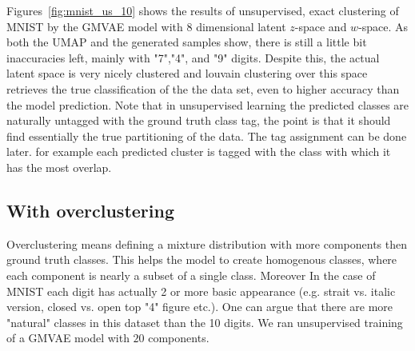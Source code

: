 \documentclass[11pt, a4paper]{report}
\theoremstyle{plain}
\theoremstyle{definition}
\theoremstyle{remark}
\begin{document}
Figures~\ref{fig:mnist_us_10} shows the results of unsupervised, exact clustering
of MNIST by the GMVAE model with 8 dimensional latent $z$-space and
$w$-space.
As both the UMAP and the generated samples show, there is still a little bit
inaccuracies left, mainly with "7","4", and "9" digits.
Despite this, the actual latent space is very nicely clustered and louvain
clustering over this space retrieves the true classification of the the data
set, even to higher accuracy than the model prediction.
Note that in unsupervised learning the predicted classes are naturally untagged
with the ground truth class tag, the point is that it should find essentially
the true partitioning of the data. The tag assignment can be done later. for
example each predicted cluster is tagged with the class with which it has the
most overlap.

\subsection{With overclustering}
Overclustering means defining a mixture distribution with more components then
ground truth classes. This helps the model to create homogenous classes,
where each component is nearly a subset of a single class.
Moreover In the case of MNIST each digit has actually 2 or more basic appearance (e.g. 
strait vs. italic version, closed vs. open top "4" figure etc.). One can argue
that there are more "natural" classes in this dataset than the 10 digits.
We ran unsupervised training of a GMVAE model with $20$ components.
\end{document}
